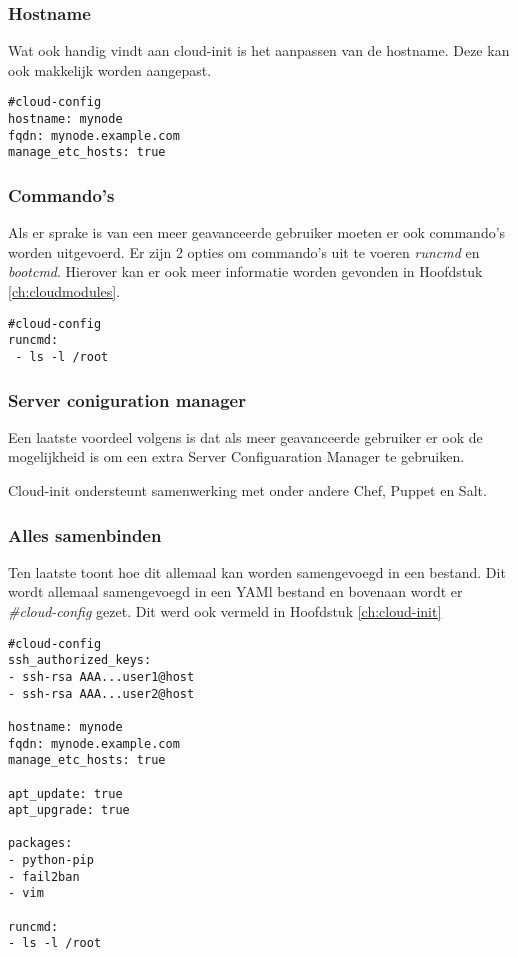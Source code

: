 \subsubsection{Hostname}
Wat \autocite{viktorpet} ook handig vindt aan cloud-init is het aanpassen van de hostname. Deze kan ook makkelijk worden aangepast.
\begin{lstlisting}[basicstyle=\small]
#cloud-config
hostname: mynode
fqdn: mynode.example.com
manage_etc_hosts: true
\end{lstlisting} 

\subsubsection{Commando's}
Als er sprake is van een meer geavanceerde gebruiker moeten er ook commando's worden uitgevoerd. Er zijn 2 opties om commando's uit te voeren \textit{runcmd} en \textit{bootcmd}. Hierover kan er ook meer informatie worden gevonden in Hoofdstuk \ref*{ch:cloudmodules}.
\begin{lstlisting}[basicstyle=\small]
#cloud-config
runcmd:
 - ls -l /root
\end{lstlisting} 
\subsubsection{Server coniguration manager}
Een laatste voordeel volgens \autocite{viktorpet} is dat als meer geavanceerde gebruiker er ook de mogelijkheid is om een extra Server Configuaration Manager te gebruiken. 

Cloud-init ondersteunt samenwerking met onder andere Chef, Puppet en Salt.
\subsubsection{Alles samenbinden}
Ten laatste toont \autocite{viktorpet} hoe dit allemaal kan worden samengevoegd in een bestand. Dit wordt allemaal samengevoegd in een YAMl bestand en bovenaan wordt er \textit{\#cloud-config} gezet. Dit werd ook vermeld in Hoofdstuk \ref*{ch:cloud-init}
\begin{lstlisting}[basicstyle=\small]
#cloud-config
ssh_authorized_keys:
- ssh-rsa AAA...user1@host
- ssh-rsa AAA...user2@host

hostname: mynode
fqdn: mynode.example.com
manage_etc_hosts: true

apt_update: true
apt_upgrade: true

packages:
- python-pip
- fail2ban
- vim

runcmd:
- ls -l /root
\end{lstlisting} 

